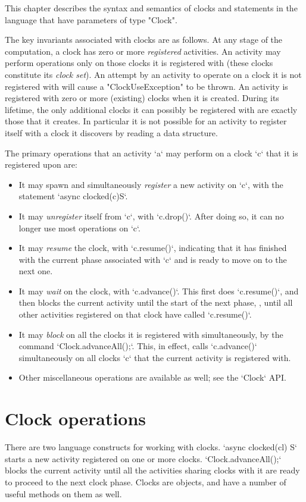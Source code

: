 This chapter describes the syntax and semantics of clocks and
statements in the language that have parameters of type \xcd"Clock". 

The key invariants associated with clocks are as follows.  At any
stage of the computation, a clock has zero or more {\em registered}
activities. An activity may perform operations only on those clocks it
is registered with (these clocks constitute its {\em clock set}). 
An attempt by an activity to operate on a clock it is not registered with
will cause a 
\xcd"ClockUseException"
to be thrown.  
An activity is registered with zero or more (existing) clocks when it is created.
During its lifetime, the only additional clocks it can possibly be registered with
are exactly those that it creates. In particular it is not possible
for an activity to register itself with a clock it discovers by
reading a data structure.

The primary operations that an activity \xcd`a` may perform on a clock \xcd`c`
that it is registered upon are: 
\begin{itemize}
\item It may spawn and simultaneously {\em register} a new activity on
      \xcd`c`, with the statement \xcd`async clocked(c)S`.
\item It may {\em unregister} itself from \xcd`c`, with \xcd`c.drop()`.  After
      doing so, it can no longer use most operations on \xcd`c`.
\item It may {\em resume} the clock, with \xcd`c.resume()`, indicating that it
      has finished with the current phase associated with \xcd`c` and is ready
      to move on to the next one.
\item It may {\em wait} on the clock, with \xcd`c.advance()`.  This first does
      \xcd`c.resume()`, and then blocks the current activity until the start
      of the next phase, \viz, until all other activities registered on that
      clock have called \xcd`c.resume()`.
\item It may {\em block} on all the clocks it is registered with
      simultaneously, by the command \xcd`Clock.advanceAll();`.  This, in effect, calls
      \xcd`c.advance()` simultaneously on all clocks \xcd`c` that the
      current activity is registered with. 
\item Other miscellaneous operations are available as well; see the
      \xcd`Clock` API.
\end{itemize}


\section{Clock operations}\label{sec:clock}
There are two language constructs for working with clocks. 
\xcd`async clocked(cl) S` starts a new activity registered on one or more
clocks.  \xcd`Clock.advanceAll();` blocks the current activity until all the activities
sharing clocks with it are ready to proceed to the next clock phase. 
Clocks are objects, and have a number of useful methods on them as well.

